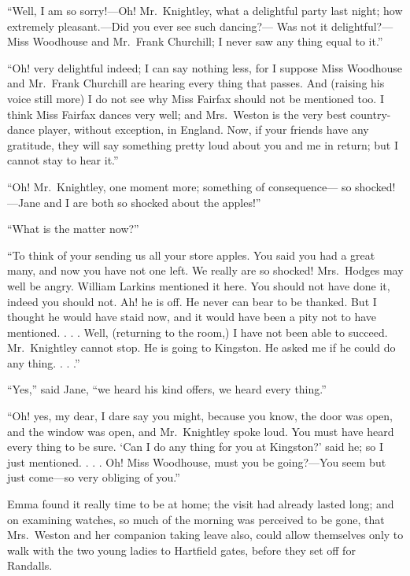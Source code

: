 ``Well, I am so sorry!---Oh!  Mr.\ Knightley, what a delightful party
last night; how extremely pleasant.---Did you ever see such dancing?---%
Was not it delightful?---Miss Woodhouse and Mr.\ Frank Churchill;
I never saw any thing equal to it.''

``Oh! very delightful indeed; I can say nothing less, for I suppose
Miss Woodhouse and Mr.\ Frank Churchill are hearing every thing
that passes.  And (raising his voice still more) I do not see why Miss
Fairfax should not be mentioned too.  I think Miss Fairfax dances
very well; and Mrs.\ Weston is the very best country-dance player,
without exception, in England.  Now, if your friends have any gratitude,
they will say something pretty loud about you and me in return;
but I cannot stay to hear it.''

``Oh!  Mr.\ Knightley, one moment more; something of consequence---%
so shocked!---Jane and I are both so shocked about the apples!''

``What is the matter now?''

``To think of your sending us all your store apples.  You said you had
a great many, and now you have not one left.  We really are so shocked!
Mrs.\ Hodges may well be angry.  William Larkins mentioned it here.
You should not have done it, indeed you should not.  Ah! he is off.
He never can bear to be thanked.  But I thought he would have staid now,
and it would have been a pity not to have mentioned. . . . Well,
(returning to the room,) I have not been able to succeed.
Mr.\ Knightley cannot stop.  He is going to Kingston.  He asked me
if he could do any thing. . . .''

``Yes,'' said Jane, ``we heard his kind offers, we heard every thing.''

``Oh! yes, my dear, I dare say you might, because you know, the door
was open, and the window was open, and Mr.\ Knightley spoke loud.
You must have heard every thing to be sure.  `Can I do any thing
for you at Kingston?' said he; so I just mentioned. . . . Oh!
Miss Woodhouse, must you be going?---You seem but just come---so very
obliging of you.''

Emma found it really time to be at home; the visit had already
lasted long; and on examining watches, so much of the morning was
perceived to be gone, that Mrs.\ Weston and her companion taking
leave also, could allow themselves only to walk with the two young
ladies to Hartfield gates, before they set off for Randalls.



